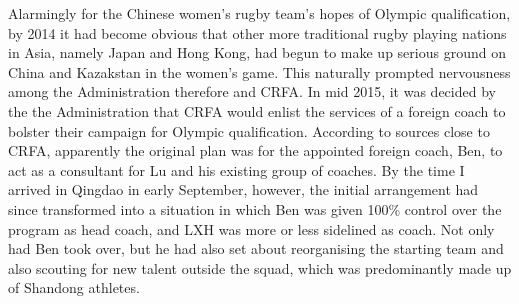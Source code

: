 Alarmingly for the Chinese women's rugby team's hopes of Olympic qualification, by 2014 it had become obvious that other more traditional rugby playing nations in Asia, namely Japan and Hong Kong, had begun to make up serious ground on China and Kazakstan in the women's game.  This naturally prompted nervousness among the Administration therefore and CRFA.  In mid 2015, it was decided by the the Administration that CRFA would enlist the services of a foreign coach to bolster their campaign for Olympic qualification.  According to sources close to CRFA, apparently the original plan was for the appointed foreign coach, Ben, to act as a consultant for Lu and his existing group of coaches.  By the time I arrived in Qingdao in early September, however, the initial arrangement had since transformed into a situation in which Ben was given 100\% control over the program as head coach, and LXH was more or less sidelined as coach. Not only had Ben took over, but he had also set about reorganising the starting team and also scouting for new talent outside the squad, which was predominantly made up of Shandong athletes.



